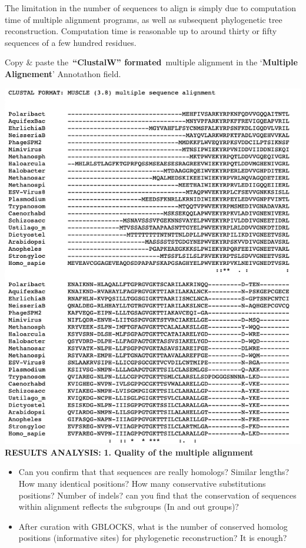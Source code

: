 \documentclass[
]{book}
\providecommand{\tightlist}{%
  \setlength{\itemsep}{0pt}\setlength{\parskip}{0pt}}
\begin{document}
The limitation in the number of sequences to align is simply due to computation time of multiple alignment programs, as well as subsequent phylogenetic tree reconstruction. Computation time is reasonable up to around thirty or fifty sequences of a few hundred residues.

Copy \& paste the~\textbf{``ClustalW'' formated}~multiple alignment in the `\textbf{Multiple Alignement}' Annotathon field.

\includegraphics{figures/Annotathon/Annot_Clustal_format.png}
\textbf{RESULTS ANALYSIS:}
\textbf{1. Quality of the multiple alignment}

\begin{itemize}
\tightlist
\item
  Can you confirm that that sequences are really homologs? Similar lengths? How many identical positions? How many conservative substitutions positions? Number of indels? can you find that the conservation of sequences within alignment reflects the subgroups (In and out groups)?
\item
  After curation with GBLOCKS, what is the number of conserved homolog positions (informative sites) for phylogenetic reconstruction? It is enough?
\end{itemize}
\end{document}
